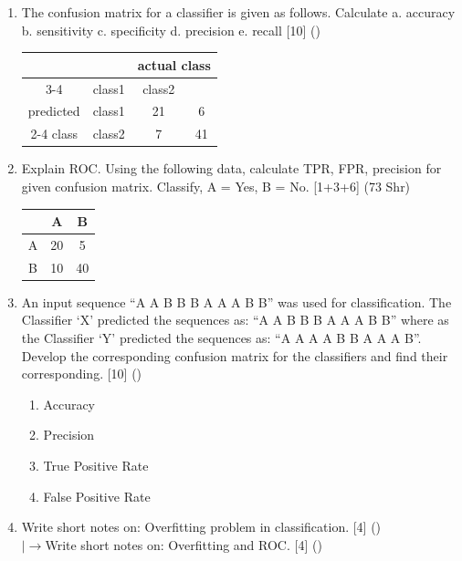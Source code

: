 \documentclass[12pt]{article}
\newcommand{\lb}{\\$\left|\rightarrow\right.$}
\begin{document}
\begin{enumerate}[topsep=0pt, noitemsep]
      \item The confusion matrix for a classifier is given as follows. Calculate a. accuracy \quad b. sensitivity \quad c. specificity \quad d. precision \quad e. recall \hfill [10] ()\\
        \small
        \begin{tabular}{|c|c|c|c|}
          \hline
          \multicolumn{2}{|c|}{} & \multicolumn{2}{c|}{actual class} \\ \cline{3-4}
          \multicolumn{2}{|c|}{} & class1 & class2 \\ \hline
          predicted & class1 & 21 & 6 \\ \cline{2-4}
          class & class2 & 7 & 41 \\ \hline
        \end{tabular}
        \normalsize

      \item Explain ROC. Using the following data, calculate TPR, FPR, precision for given confusion matrix. Classify, A = Yes, B = No. \hfill [1+3+6] (73 Shr)\\
        \small
        \begin{tabular}{|c|c|c|}
          \hline
           & A & B \\ \hline
          A & 20 & 5 \\ \hline
          B & 10 & 40 \\ \hline
        \end{tabular}
        \normalsize

      \item An input sequence ``A A B B B A A A B B'' was used for classification. The Classifier `X' predicted the sequences as: ``A A B B B A A A B B'' where as the Classifier `Y' predicted the sequences as: ``A A A A B B A A A B''. Develop the corresponding confusion matrix for the classifiers and find their corresponding. \hfill [10] ()
        \begin{enumerate}[label=\roman*),topsep=2pt,noitemsep]
          \item Accuracy
          \item Precision
          \item True Positive Rate
          \item False Positive Rate
        \end{enumerate}

      \item Write short notes on: Overfitting problem in classification. \hfill [4] ()
        \lb Write short notes on: Overfitting and ROC. \hfill [4] ()
    \end{enumerate}
\end{document}
